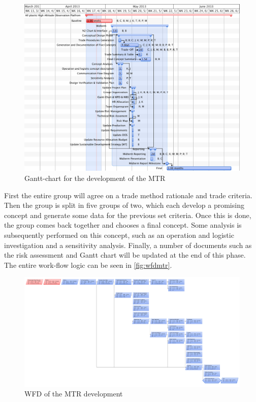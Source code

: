 \documentclass[a4paper]{report}
\begin{document}
\begin{figure}[H]
	\centering
	
	\includegraphics[width=\textwidth]{Figures/MIDGANTT.PDF}
	\caption{Gantt-chart for the development of the MTR}
	\label{fig:ganttmtr}
	
\end{figure}

First the entire group will agree on a trade method rationale and trade criteria. Then the group is split in five groups of two, which each develop a promising concept and generate some data for the previous set criteria. Once this is done, the group comes back together and chooses a final concept. Some analysis is subsequently performed on this concept, such as an operation and logistic investigation and a sensitivity analysis. Finally, a number of documents such as the risk assessment and Gantt chart will be updated at the end of this phase. The entire work-flow logic can be seen in \autoref{fig:wfdmtr}. 
\begin{figure}[H]
	\centering
	
	\includegraphics[width=\textheight, angle=270]{Figures/MIDWFD.pdf}
	\caption{WFD of the MTR development}
	\label{fig:wfdmtr}
	
\end{figure}
\end{document}
